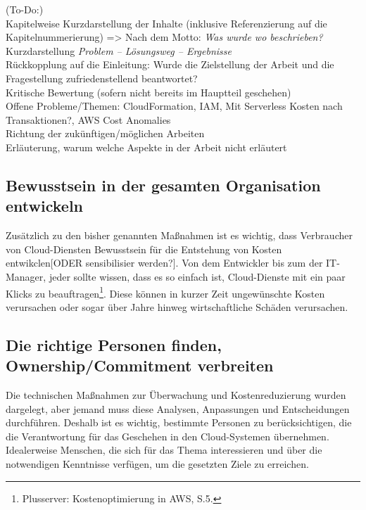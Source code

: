 (To-Do:)
\\Kapitelweise Kurzdarstellung der Inhalte (inklusive Referenzierung auf die \\Kapitelnummerierung) => Nach dem Motto: \textit{Was wurde wo beschrieben?}
\\Kurzdarstellung \textit{Problem – Lösungsweg – Ergebnisse}
\\Rückkopplung auf die Einleitung: Wurde die Zielstellung der Arbeit und die \\Fragestellung zufriedenstellend beantwortet?
\\Kritische Bewertung (sofern nicht bereits im Hauptteil geschehen)
\\Offene Probleme/Themen: CloudFormation, IAM, Mit Serverless Kosten nach Transaktionen?,  AWS Cost Anomalies
\\Richtung der zukünftigen/möglichen Arbeiten
\\Erläuterung, warum welche Aspekte in der Arbeit nicht erläutert 

\subsection*{Bewusstsein in der gesamten Organisation entwickeln}
Zusätzlich zu den bisher genannten Maßnahmen ist es wichtig, dass Verbraucher von Cloud-Diensten Bewusstsein für die Entstehung von Kosten entwikclen[ODER sensibilisier werden?]. Von dem Entwickler bis zum der IT-Manager, jeder sollte wissen, dass es so einfach ist, Cloud-Dienste mit ein paar Klicks zu beauftragen\footnote{Plusserver: Kostenoptimierung in AWS, S.5\cite{PS1}.}. Diese können in kurzer Zeit ungewünschte  Kosten verursachen oder sogar über Jahre hinweg wirtschaftliche Schäden verursachen. 
\\
\subsection*{Die richtige Personen finden, Ownership/Commitment verbreiten}
Die technischen Maßnahmen zur Überwachung und Kostenreduzierung wurden dargelegt, aber jemand muss diese Analysen, Anpassungen und Entscheidungen durchführen. 
Deshalb ist es wichtig, bestimmte Personen zu berücksichtigen, die die Verantwortung für das Geschehen in den Cloud-Systemen übernehmen. Idealerweise Menschen, die sich für das Thema interessieren und über die notwendigen Kenntnisse verfügen, um die gesetzten Ziele zu erreichen. 
\\
